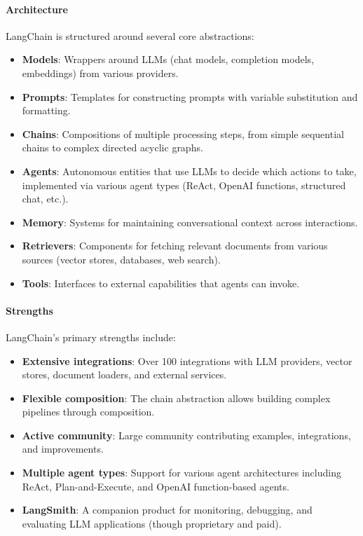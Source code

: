 \paragraph{Architecture}
LangChain is structured around several core abstractions:
\begin{itemize}
    \item \textbf{Models}: Wrappers around LLMs (chat models, completion models, embeddings) from various providers.
    \item \textbf{Prompts}: Templates for constructing prompts with variable substitution and formatting.
    \item \textbf{Chains}: Compositions of multiple processing steps, from simple sequential chains to complex directed acyclic graphs.
    \item \textbf{Agents}: Autonomous entities that use LLMs to decide which actions to take, implemented via various agent types (ReAct, OpenAI functions, structured chat, etc.).
    \item \textbf{Memory}: Systems for maintaining conversational context across interactions.
    \item \textbf{Retrievers}: Components for fetching relevant documents from various sources (vector stores, databases, web search).
    \item \textbf{Tools}: Interfaces to external capabilities that agents can invoke.
\end{itemize}

\paragraph{Strengths}
LangChain's primary strengths include:
\begin{itemize}
    \item \textbf{Extensive integrations}: Over 100 integrations with LLM providers, vector stores, document loaders, and external services.
    \item \textbf{Flexible composition}: The chain abstraction allows building complex pipelines through composition.
    \item \textbf{Active community}: Large community contributing examples, integrations, and improvements.
    \item \textbf{Multiple agent types}: Support for various agent architectures including ReAct, Plan-and-Execute, and OpenAI function-based agents.
    \item \textbf{LangSmith}: A companion product for monitoring, debugging, and evaluating LLM applications (though proprietary and paid).
\end{itemize}

